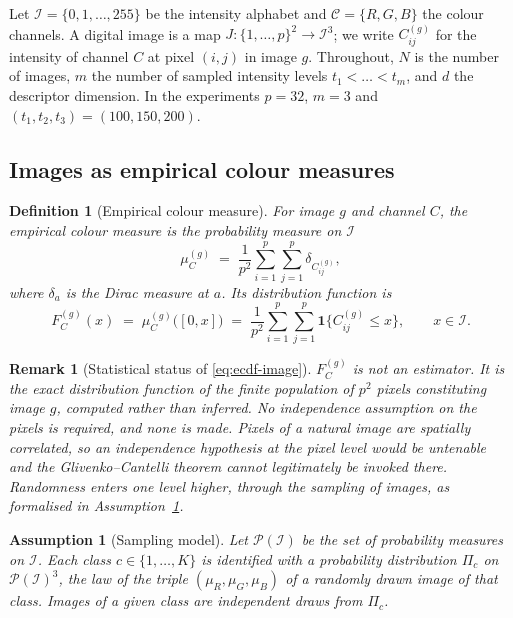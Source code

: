 \documentclass[pdflatex,sn-basic]{sn-jnl}
\theoremstyle{thmstyleone}%
\theoremstyle{thmstyletwo}%
\newtheorem{remark}{Remark}%
\theoremstyle{thmstylethree}%
\newtheorem{definition}{Definition}%
\newtheorem{assumption}{Assumption}%
\begin{document}
Let $\mathcal{I}=\{0,1,\dots,255\}$ be the intensity alphabet and
$\mathcal{C}=\{R,G,B\}$ the colour channels. A digital image is a map
$J:\{1,\dots,p\}^2\to\mathcal{I}^3$; we write $C^{(g)}_{ij}$ for the intensity
of channel $C$ at pixel $(i,j)$ in image $g$. Throughout, $N$ is the number of
images, $m$ the number of sampled intensity levels $t_1<\dots<t_m$, and $d$ the
descriptor dimension. In the experiments $p=32$, $m=3$ and
$(t_1,t_2,t_3)=(100,150,200)$.

\subsection{Images as empirical colour measures}\label{sec:measures}

\begin{definition}[Empirical colour measure]\label{def:measure}
For image $g$ and channel $C$, the empirical colour measure is the probability
measure on $\mathcal{I}$
\begin{equation}
\mu^{(g)}_C \;=\; \frac{1}{p^2}\sum_{i=1}^{p}\sum_{j=1}^{p}
\delta_{C^{(g)}_{ij}},
\end{equation}
where $\delta_a$ is the Dirac measure at $a$. Its distribution function is
\begin{equation}\label{eq:ecdf-image}
F^{(g)}_C(x) \;=\; \mu^{(g)}_C\big([0,x]\big)
\;=\;\frac{1}{p^2}\sum_{i=1}^{p}\sum_{j=1}^{p}\mathbf{1}\{C^{(g)}_{ij}\le x\},
\qquad x\in\mathcal{I}.
\end{equation}
\end{definition}

\begin{remark}[Statistical status of \eqref{eq:ecdf-image}]\label{rem:no-iid}
$F^{(g)}_C$ is not an estimator. It is the exact distribution function of the
finite population of $p^2$ pixels constituting image $g$, computed rather than
inferred. No independence assumption on the pixels is required, and none is
made. Pixels of a natural image are spatially correlated, so an independence
hypothesis at the pixel level would be untenable and the Glivenko--Cantelli
theorem cannot legitimately be invoked there. Randomness enters one level
higher, through the sampling of images, as formalised in
Assumption~\ref{ass:sampling}.
\end{remark}

\begin{assumption}[Sampling model]\label{ass:sampling}
Let $\mathcal{P}(\mathcal{I})$ be the set of probability measures on
$\mathcal{I}$. Each class $c\in\{1,\dots,K\}$ is identified with a probability
distribution $\Pi_c$ on $\mathcal{P}(\mathcal{I})^3$, the law of the triple
$(\mu_R,\mu_G,\mu_B)$ of a randomly drawn image of that class. Images of a
given class are independent draws from $\Pi_c$.
\end{assumption}
\end{document}
